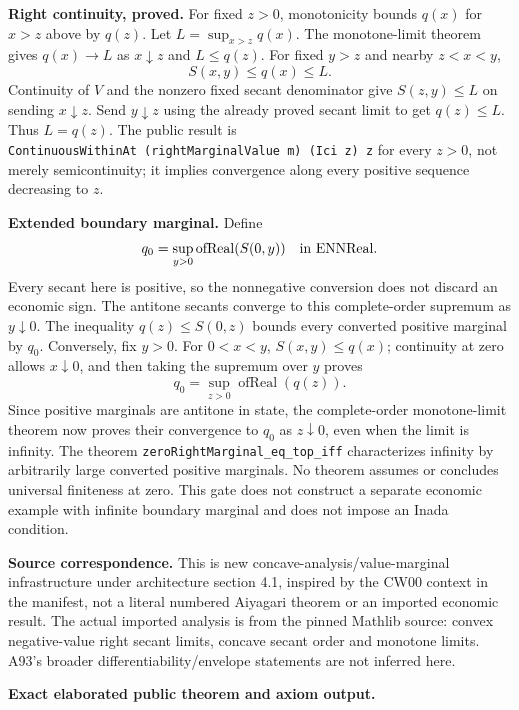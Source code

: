 \documentclass[
  11pt,
]{article}
\let\LedgerOriginalTexttt\texttt
\renewcommand{\texttt}[1]{{\small\LedgerOriginalTexttt{#1}}}
\begin{document}
\textbf{Right continuity, proved.} For fixed \(z>0\), monotonicity
bounds \(q(x)\) for \(x>z\) above by \(q(z)\). Let \(L=\sup_{x>z}q(x)\).
The monotone-limit theorem gives \(q(x)\to L\) as \(x\downarrow z\) and
\(L\leq q(z)\). For fixed \(y>z\) and nearby \(z<x<y\),
\[S(x,y)\leq q(x)\leq L.\] Continuity of \(V\) and the nonzero fixed
secant denominator give \(S(z,y)\leq L\) on sending \(x\downarrow z\).
Send \(y\downarrow z\) using the already proved secant limit to get
\(q(z)\leq L\). Thus \(L=q(z)\). The public result is
\texttt{ContinuousWithinAt\ (rightMarginalValue\ m)\ (Ici\ z)\ z} for
every \(z>0\), not merely semicontinuity; it implies convergence along
every positive sequence decreasing to \(z\).

\textbf{Extended boundary marginal.} Define
\[q_0=\sup_{y>0}\operatorname{ofReal}(S(0,y))\quad\hbox{in ENNReal}.\]
Every secant here is positive, so the nonnegative conversion does not
discard an economic sign. The antitone secants converge to this
complete-order supremum as \(y\downarrow0\). The inequality
\(q(z)\leq S(0,z)\) bounds every converted positive marginal by \(q_0\).
Conversely, fix \(y>0\). For \(0<x<y\), \(S(x,y)\leq q(x)\); continuity
at zero allows \(x\downarrow0\), and then taking the supremum over \(y\)
proves \[q_0=\sup_{z>0}\operatorname{ofReal}(q(z)).\] Since positive
marginals are antitone in state, the complete-order monotone-limit
theorem now proves their convergence to \(q_0\) as \(z\downarrow0\),
even when the limit is infinity. The theorem
\texttt{zeroRightMarginal\_eq\_top\_iff} characterizes infinity by
arbitrarily large converted positive marginals. No theorem assumes or
concludes universal finiteness at zero. This gate does not construct a
separate economic example with infinite boundary marginal and does not
impose an Inada condition.

\textbf{Source correspondence.} This is new
concave-analysis/value-marginal infrastructure under architecture
section 4.1, inspired by the CW00 context in the manifest, not a literal
numbered Aiyagari theorem or an imported economic result. The actual
imported analysis is from the pinned Mathlib source: convex
negative-value right secant limits, concave secant order and monotone
limits. A93's broader differentiability/envelope statements are not
inferred here.

\textbf{Exact elaborated public theorem and axiom output.}
\end{document}

